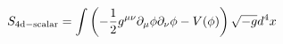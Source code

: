 \begin{equation}
S_{\rm 4d-scalar}=\int{\left(-{1 \over 2}g^{\mu \nu} \partial_{\mu} \phi \partial_{\nu} \phi-V(\phi)\right) \sqrt{-g}d^4x}
\label{NG}
\end{equation}


